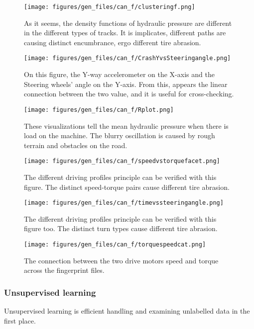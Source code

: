 		\begin{figure}[H]
			\centering
			\texttt{[image: figures/gen\_files/can\_f/clusteringf.png]}
			\caption{As it seems, the density functions of hydraulic pressure are different in the different types of tracks. It is implicates, different paths are causing distinct encumbrance, ergo different tire abrasion.} 
			\end{figure}
		\begin{figure}[H]
			\centering
			\texttt{[image: figures/gen\_files/can\_f/CrashYvsSteeringangle.png]}
			\caption{On this figure, the Y-way accelerometer on the X-axis and the Steering wheels' angle on the Y-axis. From this, appears the linear connection between the two value, and it is useful for cross-checking.} 
			\end{figure}
		\begin{figure}[H]
			\centering
			\texttt{[image: figures/gen\_files/can\_f/Rplot.png]}
			\caption{These visualizations tell the mean hydraulic pressure when there is load on the machine. The blurry oscillation is caused by rough terrain and obstacles on the road.} 
			\end{figure}		
		\begin{figure}[H]
			\centering
			\texttt{[image: figures/gen\_files/can\_f/speedvstorquefacet.png]}
			\caption{The different driving profiles principle can be verified with this figure. The distinct speed-torque pairs cause different tire abrasion.} 
			\end{figure}	
		\begin{figure}[H]
			\centering
			\texttt{[image: figures/gen\_files/can\_f/timevssteeringangle.png]}
			\caption{The different driving profiles principle can be verified with this figure too. The distinct turn types cause different tire abrasion.} 
			\end{figure}	
		\begin{figure}[H]
			\centering
			\texttt{[image: figures/gen\_files/can\_f/torquespeedcat.png]}
			\caption{The connection between the two drive motors speed and torque across the fingerprint files.} 
			\end{figure}		
	\subsubsection{Unsupervised learning}
	Unsupervised learning is efficient handling and examining unlabelled data in the first place.
	
